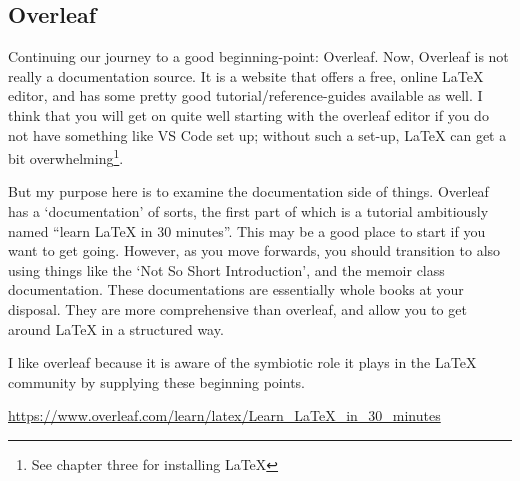 \documentclass[11pt, oneside]{memoir}
\begin{document}
\subsection{Overleaf}

Continuing our journey to a good beginning-point: Overleaf. Now, Overleaf is not really a documentation source. It is a website that offers a free, online LaTeX editor, and has some pretty good tutorial/reference-guides available as well. I think that you will get on quite well starting with the overleaf editor if you do not have something like VS Code set up; without such a set-up, LaTeX can get a bit overwhelming\footnote{See chapter three for installing LaTeX}.

But my purpose here is to examine the documentation side of things. Overleaf has a `documentation' of sorts, the first part of which is a tutorial ambitiously named ``learn LaTeX in 30 minutes''. This may be a good place to start if you want to get going. However, as you move forwards, you should transition to also using things like the `Not So Short Introduction', and the memoir class documentation. These documentations are essentially whole books at your disposal. They are more comprehensive than overleaf, and allow you to get around LaTeX in a structured way.

I like overleaf because it is aware of the symbiotic role it plays in the LaTeX community by supplying these beginning points.

\url{https://www.overleaf.com/learn/latex/Learn_LaTeX_in_30_minutes}
\end{document}
